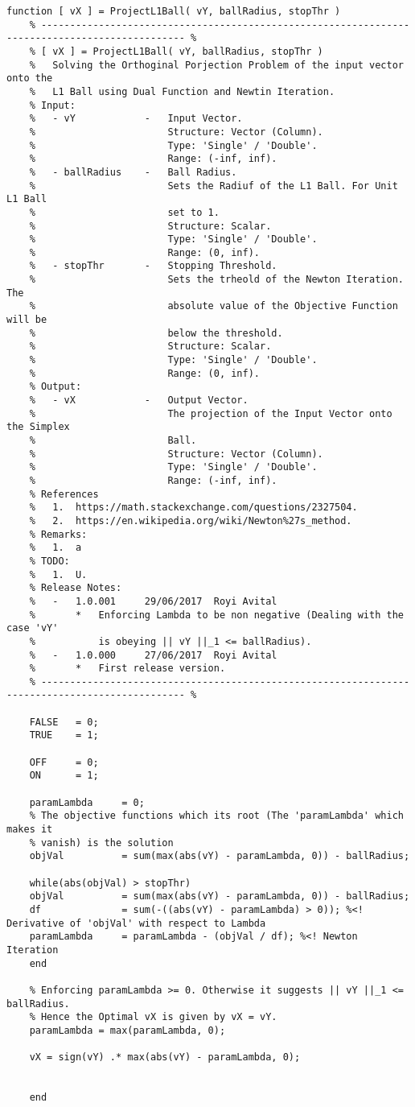 \documentclass[]{article}
\begin{document}
	\begin{lstlisting}[caption={MATLAB Code - $ {L}_{1} $ Ball Projection}, label={lst:codeL1Projection}]
	function [ vX ] = ProjectL1Ball( vY, ballRadius, stopThr )
	% ----------------------------------------------------------------------------------------------- %
	% [ vX ] = ProjectL1Ball( vY, ballRadius, stopThr )
	%   Solving the Orthoginal Porjection Problem of the input vector onto the
	%   L1 Ball using Dual Function and Newtin Iteration.
	% Input:
	%   - vY            -   Input Vector.
	%                       Structure: Vector (Column).
	%                       Type: 'Single' / 'Double'.
	%                       Range: (-inf, inf).
	%   - ballRadius    -   Ball Radius.
	%                       Sets the Radiuf of the L1 Ball. For Unit L1 Ball
	%                       set to 1.
	%                       Structure: Scalar.
	%                       Type: 'Single' / 'Double'.
	%                       Range: (0, inf).
	%   - stopThr       -   Stopping Threshold.
	%                       Sets the trheold of the Newton Iteration. The
	%                       absolute value of the Objective Function will be
	%                       below the threshold.
	%                       Structure: Scalar.
	%                       Type: 'Single' / 'Double'.
	%                       Range: (0, inf).
	% Output:
	%   - vX            -   Output Vector.
	%                       The projection of the Input Vector onto the Simplex
	%                       Ball.
	%                       Structure: Vector (Column).
	%                       Type: 'Single' / 'Double'.
	%                       Range: (-inf, inf).
	% References
	%   1.  https://math.stackexchange.com/questions/2327504.
	%   2.  https://en.wikipedia.org/wiki/Newton%27s_method.
	% Remarks:
	%   1.  a
	% TODO:
	%   1.  U.
	% Release Notes:
	%   -   1.0.001     29/06/2017  Royi Avital
	%       *   Enforcing Lambda to be non negative (Dealing with the case 'vY'
	%           is obeying || vY ||_1 <= ballRadius).
	%   -   1.0.000     27/06/2017  Royi Avital
	%       *   First release version.
	% ----------------------------------------------------------------------------------------------- %
	
	FALSE   = 0;
	TRUE    = 1;
	
	OFF     = 0;
	ON      = 1;
	
	paramLambda     = 0;
	% The objective functions which its root (The 'paramLambda' which makes it
	% vanish) is the solution
	objVal          = sum(max(abs(vY) - paramLambda, 0)) - ballRadius;
	
	while(abs(objVal) > stopThr)
	objVal          = sum(max(abs(vY) - paramLambda, 0)) - ballRadius;
	df              = sum(-((abs(vY) - paramLambda) > 0)); %<! Derivative of 'objVal' with respect to Lambda
	paramLambda     = paramLambda - (objVal / df); %<! Newton Iteration
	end
	
	% Enforcing paramLambda >= 0. Otherwise it suggests || vY ||_1 <= ballRadius.
	% Hence the Optimal vX is given by vX = vY.
	paramLambda = max(paramLambda, 0);
	
	vX = sign(vY) .* max(abs(vY) - paramLambda, 0);
	
	
	end
	
	\end{lstlisting}
	
\end{document}
